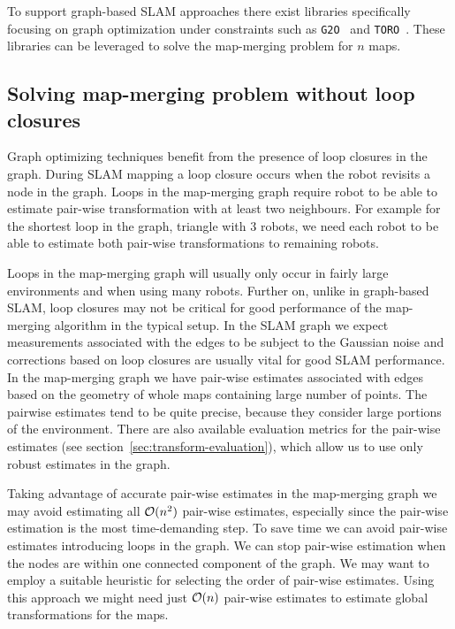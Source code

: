To support graph-based \gls{SLAM} approaches there exist libraries specifically focusing on graph optimization under constraints such as \texttt{G2O}~\citet{kummerle2011g2o} and \texttt{TORO}~\citet{grisetti2007toro}. These libraries can be leveraged to solve the map-merging problem for $n$ maps.

\subsection{Solving map-merging problem without loop closures}

Graph optimizing techniques benefit from the presence of loop closures in the graph. During \gls{SLAM} mapping a loop closure occurs when the robot revisits a node in the graph. Loops in the map-merging graph require robot to be able to estimate pair-wise transformation with at least two neighbours. For example for the shortest loop in the graph, triangle with $3$ robots, we need each robot to be able to estimate both pair-wise transformations to remaining robots.

Loops in the map-merging graph will usually only occur in fairly large environments and when using many robots. Further on, unlike in graph-based \gls{SLAM}, loop closures may not be critical for good performance of the map-merging algorithm in the typical setup. In the \gls{SLAM} graph we expect measurements associated with the edges to be subject to the Gaussian noise and corrections based on loop closures are usually vital for good \gls{SLAM} performance. In the map-merging graph we have pair-wise estimates associated with edges based on the geometry of whole maps containing large number of points. The pairwise estimates tend to be quite precise, because they consider large portions of the environment. There are also available evaluation metrics for the pair-wise estimates (see section~\ref{sec:transform-evaluation}), which allow us to use only robust estimates in the graph.

Taking advantage of accurate pair-wise estimates in the map-merging graph we may avoid estimating all $\operatorname{\mathcal{O}}(n^2)$ pair-wise estimates, especially since the pair-wise estimation is the most time-demanding step. To save time we can avoid pair-wise estimates introducing loops in the graph. We can stop pair-wise estimation when the nodes are within one connected component of the graph. We may want to employ a suitable heuristic for selecting the order of pair-wise estimates. Using this approach we might need just $\operatorname{\mathcal{O}}(n)$ pair-wise estimates to estimate global transformations for the maps.

